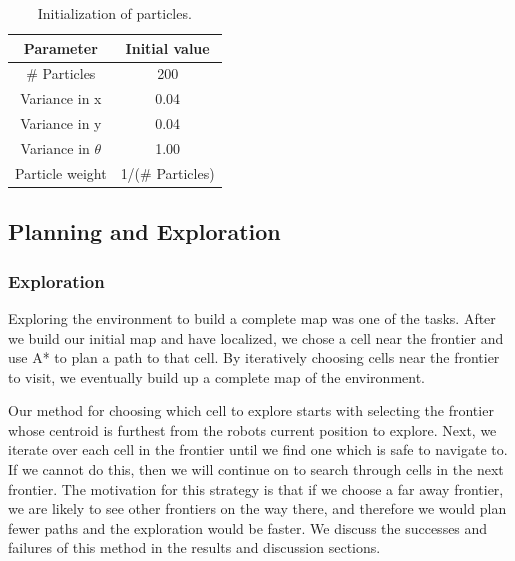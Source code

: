 \documentclass[journal]{IEEEtran}
\begin{document}
            \begin{table}[ht]
                \centering
                \begin{tabular}{|c|c|}                                 \hline
                Parameter               &   Initial value           \\ \hline
                \# Particles            &   200                     \\ \hline
                Variance in x           &   0.04                    \\ \hline
                Variance in y           &   0.04                    \\ \hline
                Variance in $\theta$    &   1.00                    \\ \hline
                Particle weight         &   1/(\# Particles)        \\ \hline
                \end{tabular}
                \caption{Initialization of particles.}
                \label{tab:intial_distribution}
            \end{table}
            
            
            
    \subsection{Planning and Exploration}
        
        \subsubsection{Exploration}
        
            Exploring the environment to build a complete map was one of the tasks. After we build our initial map and have localized, we chose a cell near the frontier and use A* to plan a path to that cell. By iteratively choosing cells near the frontier to visit, we eventually build up a complete map of the environment.
            
            Our method for choosing which cell to explore starts with selecting the frontier whose centroid is furthest from the robots current position to explore. Next, we iterate over each cell in the frontier until we find one which is safe to navigate to. If we cannot do this, then we will continue on to search through cells in the next frontier. The motivation for this strategy is that if we choose a far away frontier, we are likely to see other frontiers on the way there, and therefore we would plan fewer paths and the exploration would be faster. We discuss the successes and failures of this method in the results and discussion sections.
        
\end{document}
